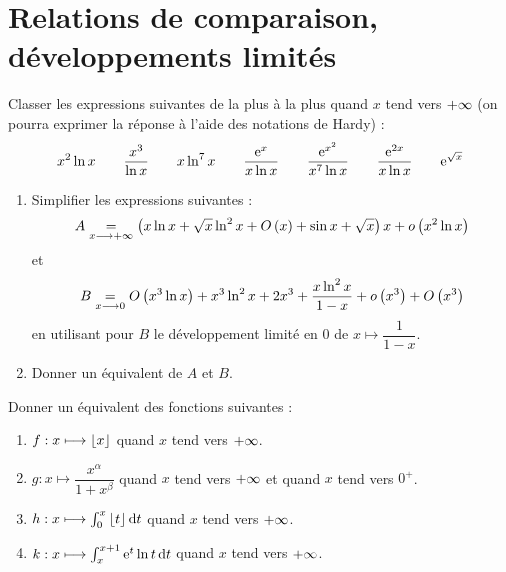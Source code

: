 \chapter{Relations de comparaison, développements limités}

\minitoc

\begin{exo}
Classer les expressions suivantes de la plus  à la plus  quand \(x\) tend vers \(+\infty\) (on pourra exprimer la réponse à l'aide des notations de Hardy) : \[x^2\ln x\qquad\dfrac{x^3}{\ln x}\qquad x\ln^7x\qquad\dfrac{\mathrm{e}^{x}}{x\ln x}\qquad\dfrac{\mathrm{e}^{x^2}}{x^7\ln x}\qquad\dfrac{\mathrm{e}^{2x}}{x\ln x}\qquad\mathrm{e}^{\sqrt{x}}\]
\end{exo}

\begin{corr}
\end{corr}

\begin{exo}
\begin{enumerate}
\item Simplifier les expressions suivantes : \[A\underset{x\longrightarrow+\infty}{=}\left(x\ln x+\sqrt{x}\ln^2x+O\left(x\right)+\sin x+\sqrt{x}\right)x+o\left(x^2\ln x\right)\] et \[B\underset{x\longrightarrow0}{=}O\left(x^3\ln x\right)+x^3\ln^2x+2x^3+\dfrac{x\ln^2x}{1-x}+o\left(x^3\right)+O\left(x^3\right)\] en utilisant pour \(B\) le développement limité en \(0\) de \(x\mapsto\dfrac{1}{1-x}\). \\

\item Donner un équivalent de \(A\) et \(B\).
\end{enumerate}
\end{exo}

\begin{corr}
\end{corr}

\begin{exo}
Donner un équivalent des fonctions suivantes :

\begin{enumerate}
\item \(f:x\longmapsto\left\lfloor x\right\rfloor\) quand \(x\) tend vers \(+\infty\). \\

\item \(g:x\mapsto\dfrac{x^{\alpha}}{1+x^{\beta}}\) quand \(x\) tend vers \(+\infty\) et quand \(x\) tend vers \(0^+\). \\

\item \(h:x\mapsto\int_0^x\floor{t}\odif{t}\) quand \(x\) tend vers \(+\infty\). \\

\item \(k:x\mapsto\int_x^{x+1}\e{t}\ln t\odif{t}\) quand \(x\) tend vers \(+\infty\).
\end{enumerate}
\end{exo}

